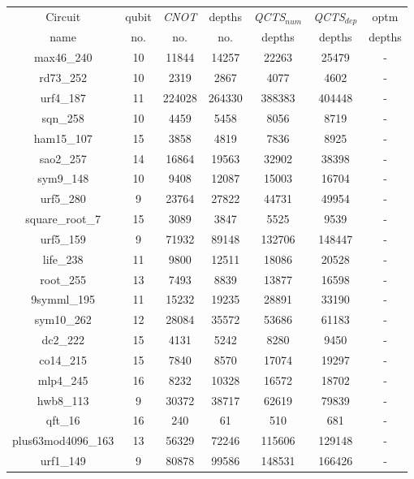 \documentclass[runningheads]{llncs}
\begin{document}
								\begin{table}[H]
									\begin{center}  
									\begin{tabular}{|c|c|c|c|c|c|c|}
									\hline
									Circuit &  qubit  & \textit{CNOT} &depths &\textit{QCTS$_{num}$}& \textit{QCTS$_{dep}$}  & optm 	  	\\
									 name	&   no. 	&	no. & no. & depths&  depths &  depths 	\\
									\hline
									max46\_240 & 10 & 11844 & 14257 & 22263 & 25479 & - \\
									rd73\_252 & 10 & 2319 & 2867 & 4077 & 4602 & - \\
									urf4\_187 & 11 & 224028 & 264330 & 388383 & 404448 & - \\
									sqn\_258 & 10 & 4459 & 5458 & 8056 & 8719 & - \\
									ham15\_107 & 15 & 3858 & 4819 & 7836 & 8925 & - \\
									sao2\_257 & 14 & 16864 & 19563 & 32902 & 38398 & - \\
									sym9\_148 & 10 & 9408 & 12087 & 15003 & 16704 & - \\
									urf5\_280 & 9 & 23764 & 27822 & 44731 & 49954 & - \\
									square\_root\_7 & 15 & 3089 & 3847 & 5525 & 9539 & - \\
									urf5\_159 & 9 & 71932 & 89148 & 132706 & 148447 & - \\
									life\_238 & 11 & 9800 & 12511 & 18086 & 20528 & - \\
									root\_255 & 13 & 7493 & 8839 & 13877 & 16598 & - \\
									9symml\_195 & 11 & 15232 & 19235 & 28891 & 33190 & - \\
									sym10\_262 & 12 & 28084 & 35572 & 53686 & 61183 & - \\
									dc2\_222 & 15 & 4131 & 5242 & 8280 & 9450 & - \\
									co14\_215 & 15 & 7840 & 8570 & 17074 & 19297 & - \\
									mlp4\_245 & 16 & 8232 & 10328 & 16572 & 18702 & - \\
									hwb8\_113 & 9 & 30372 & 38717 & 62619 & 79839 & - \\
									qft\_16 & 16 & 240 & 61 & 510 & 681 & - \\
									plus63mod4096\_163 & 13 & 56329 & 72246 & 115606 & 129148 & - \\
									urf1\_149 & 9 & 80878 & 99586 & 148531 & 166426 & - \\

\end{tabular}
\end{center}
\end{table}
\end{document}
